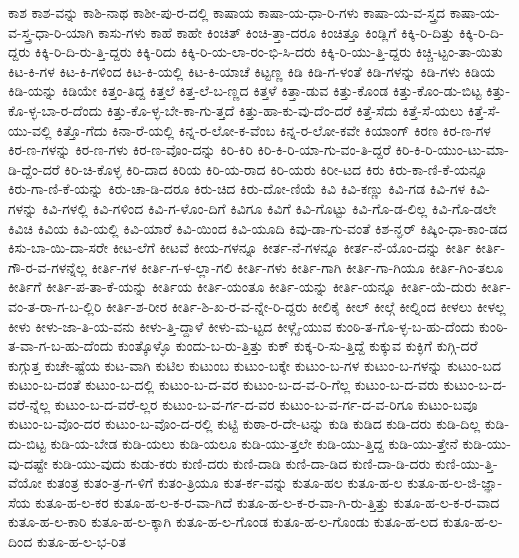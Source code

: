 {ಕಾಶ
ಕಾಶ-ವನ್ನು
ಕಾಶಿ-ನಾಥ
ಕಾಶೀ-ಪು-ರ-ದಲ್ಲಿ
ಕಾಷಾಯ
ಕಾಷಾ-ಯ-ಧಾ-ರಿ-ಗಳು
ಕಾಷಾ-ಯ-ವ-ಸ್ತ್ರದ
ಕಾಷಾ-ಯ-ವ-ಸ್ತ್ರ-ಧಾ-ರಿ-ಯಾಗಿ
ಕಾಸು-ಗಳು
ಕಾಹೆ
ಕಾಹೇ
ಕಿಂಚಿತ್
ಕಿಂಚಿ-ತ್ತಾ-ದರೂ
ಕಿಂಚಿತ್ತೂ
ಕಿಂಡ್ಲಿಗೆ
ಕಿಕ್ಕಿ-ರಿ-ದಿತ್ತು
ಕಿಕ್ಕಿ-ರಿ-ದಿ-ದ್ದರು
ಕಿಕ್ಕಿ-ರಿ-ದಿ-ರು-ತ್ತಿ-ದ್ದರು
ಕಿಕ್ಕಿ-ರಿದು
ಕಿಕ್ಕಿ-ರಿ-ಯ-ಲಾ-ರಂ-ಭಿ-ಸಿ-ದರು
ಕಿಕ್ಕಿ-ರಿ-ಯು-ತ್ತಿ-ದ್ದರು
ಕಿಚ್ಚಿ-ಟ್ಟಂ-ತಾ-ಯಿತು
ಕಿಟ-ಕಿ-ಗಳ
ಕಿಟ-ಕಿ-ಗಳಿಂದ
ಕಿಟ-ಕಿ-ಯಲ್ಲಿ
ಕಿಟ-ಕಿ-ಯಾಚೆ
ಕಿಟ್ಟಣ್ಣ
ಕಿಡಿ
ಕಿಡಿ-ಗ-ಳಂತೆ
ಕಿಡಿ-ಗಳನ್ನು
ಕಿಡಿ-ಗಳು
ಕಿಡಿಯ
ಕಿಡಿ-ಯನ್ನು
ಕಿಡಿಯೇ
ಕಿತ್ತಂ-ತಿದ್ದ
ಕಿತ್ತಲೆ
ಕಿತ್ತ-ಲೆ-ಬ-ಣ್ಣದ
ಕಿತ್ತಳೆ
ಕಿತ್ತಾ-ಡುವ
ಕಿತ್ತು-ಕೊಂಡ
ಕಿತ್ತು-ಕೊಂ-ಡು-ಬಿಟ್ಟ
ಕಿತ್ತು-ಕೊ-ಳ್ಳ-ಬಾ-ರ-ದೆಂದು
ಕಿತ್ತು-ಕೊ-ಳ್ಳ-ಬೇ-ಕಾ-ಗು-ತ್ತದೆ
ಕಿತ್ತು-ಹಾ-ಕು-ವು-ದೆಂ-ದರೆ
ಕಿತ್ತೆ-ಸೆದು
ಕಿತ್ತೆ-ಸೆ-ಯಲು
ಕಿತ್ತೆ-ಸೆ-ಯು-ವಲ್ಲಿ
ಕಿತ್ತೊ-ಗೆದು
ಕಿನಾ-ರೆ-ಯಲ್ಲಿ
ಕಿನ್ನ-ರ-ಲೋ-ಕ-ವೆಂಬ
ಕಿನ್ನ-ರ-ಲೋ-ಕವೇ
ಕಿಯಾಂಗ್
ಕಿರಣ
ಕಿರ-ಣ-ಗಳ
ಕಿರ-ಣ-ಗಳನ್ನು
ಕಿರ-ಣ-ಗಳು
ಕಿರ-ಣ-ವೊಂ-ದನ್ನು
ಕಿರಿ-ಕಿರಿ
ಕಿರಿ-ಕಿ-ರಿ-ಯಾ-ಗು-ವಂ-ತಿ-ದ್ದರೆ
ಕಿರಿ-ಕಿ-ರಿ-ಯುಂ-ಟು-ಮಾ-ಡಿ-ದ್ದೆಂ-ದರೆ
ಕಿರಿ-ಚಿ-ಕೊಳ್ಳ
ಕಿರಿ-ದಾದ
ಕಿರಿಯ
ಕಿರಿ-ಯ-ರಾದ
ಕಿರಿ-ಯರು
ಕಿರೀ-ಟದ
ಕಿರು
ಕಿರು-ಕಾ-ಣಿ-ಕೆ-ಯನ್ನೂ
ಕಿರು-ಗಾ-ಣಿ-ಕೆ-ಯನ್ನು
ಕಿರು-ಚಾ-ಡಿ-ದರೂ
ಕಿರು-ಚಿದ
ಕಿರು-ದೋ-ಣಿಯೆ
ಕಿವಿ
ಕಿವಿ-ಕಣ್ಣು
ಕಿವಿ-ಗಡ
ಕಿವಿ-ಗಳ
ಕಿವಿ-ಗಳನ್ನು
ಕಿವಿ-ಗಳಲ್ಲಿ
ಕಿವಿ-ಗಳಿಂದ
ಕಿವಿ-ಗ-ಳೊಂ-ದಿಗೆ
ಕಿವಿಗೂ
ಕಿವಿಗೆ
ಕಿವಿ-ಗೊಟ್ಟು
ಕಿವಿ-ಗೊ-ಡ-ಲಿಲ್ಲ
ಕಿವಿ-ಗೊ-ಡಲೇ
ಕಿವಿಚಿ
ಕಿವಿಯ
ಕಿವಿ-ಯಲ್ಲಿ
ಕಿವಿ-ಯಾರೆ
ಕಿವಿ-ಯಿಂದ
ಕಿವಿ-ಯೂದಿ
ಕಿವು-ಡಾ-ಗು-ವಂತೆ
ಕಿಶ-ನ್ಘರ್
ಕಿಷ್ಕಿಂ-ಧಾ-ಕಾಂ-ಡದ
ಕಿಸು-ಬಾ-ಯಿ-ದಾ-ಸರೇ
ಕೀಟ-ಲೆಗೆ
ಕೀಟವೆ
ಕೀಯ-ಗಳನ್ನೂ
ಕೀರ್ತ-ನೆ-ಗಳನ್ನೂ
ಕೀರ್ತ-ನೆ-ಯೊಂ-ದನ್ನು
ಕೀರ್ತಿ
ಕೀರ್ತಿ-ಗೌ-ರ-ವ-ಗಳನ್ನೆಲ್ಲ
ಕೀರ್ತಿ-ಗಳ
ಕೀರ್ತಿ-ಗ-ಳ-ಲ್ಲಾ-ಗಲಿ
ಕೀರ್ತಿ-ಗಳು
ಕೀರ್ತಿ-ಗಾಗಿ
ಕೀರ್ತಿ-ಗಾ-ಗಿಯೂ
ಕೀರ್ತಿ-ಗಿಂ-ತಲೂ
ಕೀರ್ತಿಗೆ
ಕೀರ್ತಿ-ಪ-ತಾ-ಕೆ-ಯನ್ನು
ಕೀರ್ತಿಯ
ಕೀರ್ತಿ-ಯಂತೂ
ಕೀರ್ತಿ-ಯನ್ನು
ಕೀರ್ತಿ-ಯನ್ನೂ
ಕೀರ್ತಿ-ಯೆ-ದುರು
ಕೀರ್ತಿ-ವಂ-ತ-ರಾ-ಗ-ಬ-ಲ್ಲಿರಿ
ಕೀರ್ತಿ-ಶ-ರೀರ
ಕೀರ್ತಿ-ಶಿ-ಖ-ರ-ವ-ನ್ನೇ-ರಿ-ದ್ದರು
ಕೀಲಿಕೈ
ಕೀಲ್
ಕೀಲ್ಗೆ
ಕೀಲ್ನಿಂದ
ಕೀಳಲು
ಕೀಳಲ್ಲ
ಕೀಳು
ಕೀಳು-ಜಾ-ತಿ-ಯ-ವನು
ಕೀಳು-ತ್ತಿ-ದ್ದಾಳೆ
ಕೀಳು-ಮ-ಟ್ಟದ
ಕೀಳ್ಗೈ-ಯುವ
ಕುಂಠಿ-ತ-ಗೊ-ಳ್ಳ-ಬ-ಹು-ದೆಂದು
ಕುಂಠಿ-ತ-ವಾ-ಗ-ಬ-ಹು-ದೆಂದು
ಕುಂತ್ಕೊಳ್ಳೊ
ಕುಂದು-ಬ-ರು-ತ್ತಿತ್ತು
ಕುಕ್
ಕುಕ್ಕ-ರಿ-ಸು-ತ್ತಿದ್ದೆ
ಕುಕ್ಕುವ
ಕುಕ್ಳಿಗೆ
ಕುಗ್ಗಿ-ದರೆ
ಕುಗ್ಗುತ್ತ
ಕುಚೇ-ಷ್ಟೆಯ
ಕುಟ-ವಾಗಿ
ಕುಟಿಲ
ಕುಟುಂಬ
ಕುಟುಂ-ಬಕ್ಕೇ
ಕುಟುಂ-ಬ-ಗಳ
ಕುಟುಂ-ಬ-ಗಳನ್ನು
ಕುಟುಂ-ಬದ
ಕುಟುಂ-ಬ-ದಂತೆ
ಕುಟುಂ-ಬ-ದಲ್ಲಿ
ಕುಟುಂ-ಬ-ದ-ವರ
ಕುಟುಂ-ಬ-ದ-ವ-ರಿ-ಗೆಲ್ಲ
ಕುಟುಂ-ಬ-ದ-ವರು
ಕುಟುಂ-ಬ-ದ-ವರೆ-ನ್ನೆಲ್ಲ
ಕುಟುಂ-ಬ-ದ-ವರೆ-ಲ್ಲರ
ಕುಟುಂ-ಬ-ವ-ರ್ಗ-ದ-ವರ
ಕುಟುಂ-ಬ-ವ-ರ್ಗ-ದ-ವ-ರಿಗೂ
ಕುಟುಂ-ಬವೂ
ಕುಟುಂ-ಬ-ವೊಂ-ದರ
ಕುಟುಂ-ಬ-ವೊಂ-ದ-ರಲ್ಲಿ
ಕುಟ್ಟಿ
ಕುಠಾ-ರ-ದೇ-ಟನ್ನು
ಕುಡಿ
ಕುಡಿದ
ಕುಡಿ-ದರು
ಕುಡಿ-ದಿಲ್ಲ
ಕುಡಿ-ದು-ಬಿಟ್ಟ
ಕುಡಿ-ಯ-ಬೇಡ
ಕುಡಿ-ಯಲು
ಕುಡಿ-ಯಲೂ
ಕುಡಿ-ಯು-ತ್ತಲೇ
ಕುಡಿ-ಯು-ತ್ತಿದ್ದ
ಕುಡಿ-ಯು-ತ್ತೇನೆ
ಕುಡಿ-ಯು-ವು-ದಷ್ಟೇ
ಕುಡಿ-ಯು-ವುದು
ಕುಡು-ಕರು
ಕುಣಿ-ದರು
ಕುಣಿ-ದಾಡಿ
ಕುಣಿ-ದಾ-ಡಿದ
ಕುಣಿ-ದಾ-ಡಿ-ದರು
ಕುಣಿ-ಯು-ತ್ತಿ-ವೆಯೋ
ಕುತಂತ್ರ
ಕುತಂ-ತ್ರ-ಗ-ಳಿಗೆ
ಕುತಂ-ತ್ರಿಯೂ
ಕುತ-ರ್ಕ-ವನ್ನು
ಕುತೂ-ಹಲ
ಕುತೂ-ಹ-ಲ
ಕುತೂ-ಹ-ಲ-ಜಿ-ಜ್ಞಾ-ಸೆಯ
ಕುತೂ-ಹ-ಲ-ಕರ
ಕುತೂ-ಹ-ಲ-ಕ-ರ-ವಾ-ಗಿದೆ
ಕುತೂ-ಹ-ಲ-ಕ-ರ-ವಾ-ಗಿ-ರು-ತ್ತಿತ್ತು
ಕುತೂ-ಹ-ಲ-ಕ-ರ-ವಾದ
ಕುತೂ-ಹ-ಲ-ಕಾರಿ
ಕುತೂ-ಹ-ಲ-ಕ್ಕಾಗಿ
ಕುತೂ-ಹ-ಲ-ಗೊಂಡ
ಕುತೂ-ಹ-ಲ-ಗೊಂಡು
ಕುತೂ-ಹ-ಲದ
ಕುತೂ-ಹ-ಲ-ದಿಂದ
ಕುತೂ-ಹ-ಲ-ಭ-ರಿತ
}
